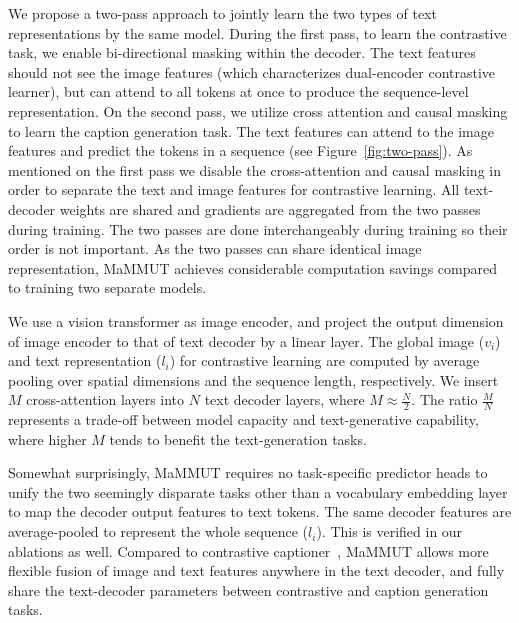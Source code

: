 \documentclass[10pt]{article} \usepackage[accepted]{tmlr}
\newcommand{\ours}{MaMMUT\xspace}
\begin{document}
We propose a two-pass approach to jointly learn the two types of text representations by the same model. During the first pass, to learn the contrastive task, we enable bi-directional masking within the decoder. The text features should not see the image features (which characterizes dual-encoder contrastive learner), but can attend to all tokens at once to produce the sequence-level representation.
On the second pass, we utilize cross attention and causal masking to learn the caption generation task. The text features can attend to the image features and predict the tokens in a sequence (see Figure~\ref{fig:two-pass}). As mentioned on the first pass we disable the cross-attention and causal masking in order to separate the text and image features for contrastive learning. All text-decoder weights are shared and gradients are aggregated from the two passes during training. The two passes are done interchangeably during training so their order is not important. 
As the two passes can share identical image representation, \ours achieves considerable computation savings compared to training two separate models.

We use a vision transformer as image encoder, and project the output dimension of image encoder to that of text decoder by a linear layer. The global image ($v_i$) and text representation ($l_i$) for contrastive learning are computed by average pooling over spatial dimensions and the sequence length, respectively. We insert $M$ cross-attention layers into $N$ text decoder layers, where $M \approx \frac{N}{2}$. The ratio $\frac{M}{N}$ represents a trade-off between model capacity and text-generative capability, where higher $M$ tends to benefit the text-generation tasks.

Somewhat surprisingly, \ours requires no task-specific predictor heads to unify the two seemingly disparate tasks other than a vocabulary embedding layer to map the decoder output features to text tokens. The same decoder features are average-pooled to represent the whole sequence ($l_i$). This is verified in our ablations as well.
Compared to contrastive captioner~\citep{yu2022coca}, \ours allows more flexible fusion of image and text features anywhere in the text decoder, and fully share the text-decoder parameters between contrastive and caption generation tasks. 
\end{document}
